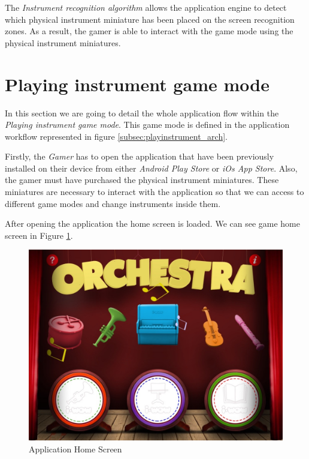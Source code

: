 The \textit{Instrument recognition algorithm} allows the application engine to detect which physical instrument miniature has been placed on the screen recognition zones. As a result, the gamer is able to interact with the game mode using the physical instrument miniatures.

\newpage
\section{Playing instrument game mode}
\label{sec:playinginstrumentgm}

In this section we are going to detail the whole application flow within the \textit{Playing instrument game mode}. This game mode is defined in the application workflow represented in figure \ref{subsec:playinstrument_arch}.

Firstly, the \textit{Gamer} has to open the application that have been previously installed on their device from either \textit{Android Play Store} or \textit{iOs App Store}. Also, the gamer must have purchased the physical instrument miniatures. These miniatures are necessary to interact with the application so that we can access to different game modes and change instruments inside them.

After opening the application the home screen is loaded. We can see game home screen in Figure \ref{fig:home_screen}.

\begin{figure}[ht!]
	\centering
	\includegraphics[width=400pt]{graphics/use-case/home_screen.jpg}
	\caption{Application Home Screen}
	\label{fig:home_screen}
\end{figure}


